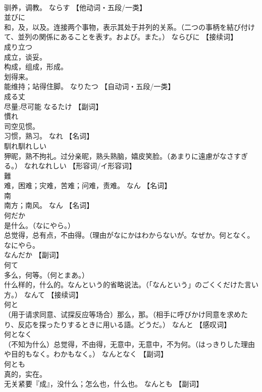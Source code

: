 \documentclass[8pt]{extreport}
\begin{document}
\begin{CJK}{UTF8}{min}
\\	驯养，调教。	ならす		【他动词・五段/一类】
\\	並びに	
\\	和，及，以及。连接两个事物，表示其处于并列的关系。（二つの事柄を結び付けて、並列の関係にあることを表す。および。また。）	ならびに		【接续词】
\\	成り立つ	
\\	成立，谈妥。 
\\	构成，组成，形成。 
\\	划得来。 
\\	能维持；站得住脚。	なりたつ		【自动词・五段/一类】
\\	成る丈	
\\	尽量;尽可能	なるたけ		【副词】
\\	慣れ	
\\	司空见惯。 
\\	习惯，熟习。	なれ		【名词】
\\	馴れ馴れしい	
\\	狎昵，熟不拘礼。过分亲昵，熟头熟脑，嬉皮笑脸。（あまりに遠慮がなさすぎる。）	なれなれしい		【形容词/イ形容词】
\\	難	
\\	难，困难；灾难，苦难；问难，责难。	なん		【名词】
\\	南	
\\	南方；南风。	なん		【名词】
\\	何だか	
\\	是什么。（なにやら。） 
\\	总觉得，总有点，不由得。（理由がなにかはわからないが。なぜか。何となく。なにやら。 
\\	なんだか		【副词】
\\	何て	
\\	多么，何等。（何とまあ。） 
\\	什么样的，什么的。なんという的省略说法。（「なんという」のごくくだけた言い方。）	なんて		【接续词】
\\	何と	
\\	（用于请求同意、试探反应等场合）那么，那。（相手に呼びかけ同意を求めたり、反応を探ったりするときに用いる語。どうだ。）	なんと		【感叹词】
\\	何となく	
\\	（不知为什么）总觉得，不由得，无意中，无意中，不为何。（はっきりした理由や目的もなく。わかもなく。）	なんとなく		【副词】
\\	何とも	
\\	真的，实在。 
\\	无关紧要『成』，没什么；怎么也，什么也。	なんとも		【副词】

\end{CJK}
\end{document}
